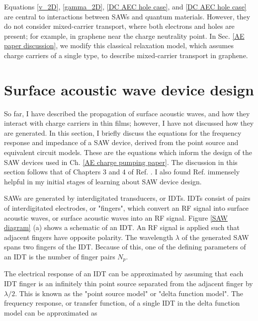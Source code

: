 \documentclass[double,12pt,1in]{beavtex}
\begin{document}
Equations \ref{v_2D}, \ref{gamma_2D}, \ref{DC AEC hole case}, and \ref{DC AEC hole case} are central to interactions between SAWs and quantum materials. However, they do not consider mixed-carrier transport, where both electrons and holes are present; for example, in graphene near the charge neutrality point. In Sec. \ref{AE paper discussion}, we modify this classical relaxation model, which assumes charge carriers of a single type, to describe mixed-carrier transport in graphene.


\section{Surface acoustic wave device design} \label{SAW device design}

So far, I have described the propagation of surface acoustic waves, and how they interact with charge carriers in thin films; however, I have not discussed how they are generated. In this section, I briefly discuss the equations for the frequency response and impedance of a SAW device, derived from the point source and equivalent circuit models. These are the equations which inform the design of the SAW devices used in Ch. \ref{AE charge pumping paper}. The discussion in this section follows that of Chapters 3 and 4 of Ref. \cite{campbell_surface_1989}. I also found Ref. \cite{lane_integrating_2021} immensely helpful in my initial stages of learning about SAW device design.

SAWs are generated by interdigitated transducers, or IDTs. IDTs consist of pairs of interdigitated electrodes, or "fingers", which convert an RF signal into surface acoustic waves, or surface acoustic waves into an RF signal. Figure \ref{SAW diagram} (a) shows a schematic of an IDT. An RF signal is applied such that adjacent fingers have opposite polarity. The wavelength $\lambda$ of the generated SAW spans two fingers of the IDT. Because of this, one of the defining parameters of an IDT is the number of finger pairs $N_p$. 

The electrical response of an IDT can be approximated by assuming that each IDT finger is an infinitely thin point source separated from the adjacent finger by $\lambda/2$. This is known as the "point source model" or "delta function model". The frequency response, or transfer function, of a single IDT in the delta function model can be approximated as 
\end{document}
